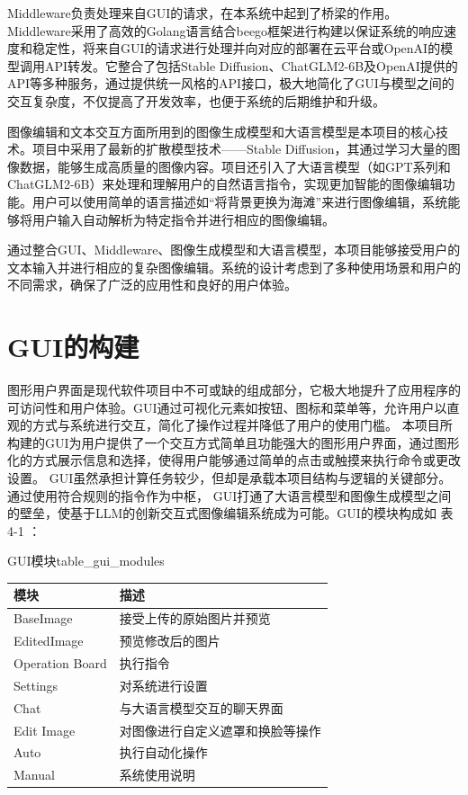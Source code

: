 \documentclass[a4paper,AutoFakeBold,oneside,12pt]{book}
\begin{document}
Middleware负责处理来自GUI的请求，在本系统中起到了桥梁的作用。Middleware采用了高效的Golang语言结合beego框架进行构建以保证系统的响应速度和稳定性，将来自GUI的请求进行处理并向对应的部署在云平台或OpenAI的模型调用API转发。它整合了包括Stable Diffusion、ChatGLM2-6B及OpenAI提供的API等多种服务，通过提供统一风格的API接口，极大地简化了GUI与模型之间的交互复杂度，不仅提高了开发效率，也便于系统的后期维护和升级。

图像编辑和文本交互方面所用到的图像生成模型和大语言模型是本项目的核心技术。项目中采用了最新的扩散模型技术——Stable Diffusion，其通过学习大量的图像数据，能够生成高质量的图像内容。项目还引入了大语言模型（如GPT系列和ChatGLM2-6B）来处理和理解用户的自然语言指令，实现更加智能的图像编辑功能。用户可以使用简单的语言描述如“将背景更换为海滩”来进行图像编辑，系统能够将用户输入自动解析为特定指令并进行相应的图像编辑。

通过整合GUI、Middleware、图像生成模型和大语言模型，本项目能够接受用户的文本输入并进行相应的复杂图像编辑。系统的设计考虑到了多种使用场景和用户的不同需求，确保了广泛的应用性和良好的用户体验。


\section{GUI的构建} %
图形用户界面是现代软件项目中不可或缺的组成部分，它极大地提升了应用程序的可访问性和用户体验。GUI通过可视化元素如按钮、图标和菜单等，允许用户以直观的方式与系统进行交互，简化了操作过程并降低了用户的使用门槛。
本项目所构建的GUI为用户提供了一个交互方式简单且功能强大的图形用户界面，通过图形化的方式展示信息和选择，使得用户能够通过简单的点击或触摸来执行命令或更改设置。
GUI虽然承担计算任务较少，但却是承载本项目结构与逻辑的关键部分。通过使用符合规则的指令作为中枢，
GUI打通了大语言模型和图像生成模型之间的壁垒，使基于LLM的创新交互式图像编辑系统成为可能。GUI的模块构成如 表4-1 ：
\begin{bupttable}{GUI模块}{table_gui_modules}
    \begin{tabular}{|l|l|}
        \hline \textbf{模块} & \textbf{描述} \\
        \hline BaseImage & 接受上传的原始图片并预览  \\
        \hline EditedImage & 预览修改后的图片 \\
        \hline Operation Board & 执行指令  \\
		\hline Settings & 对系统进行设置  \\
		\hline Chat & 与大语言模型交互的聊天界面  \\
		\hline Edit Image & 对图像进行自定义遮罩和换脸等操作  \\
		\hline Auto & 执行自动化操作  \\
		\hline Manual & 系统使用说明  \\
        \hline
    \end{tabular}
\end{bupttable}
\end{document}
